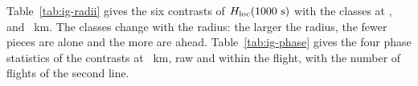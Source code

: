 Table~\ref{tab:ig-radii} gives the six contrasts of $\Hk$ with the classes at \IgRadLow, \IgRMain{} and \IgRadHigh~km. The classes change with the radius: the larger the radius, the fewer pieces are alone and the more are ahead. Table~\ref{tab:ig-phase} gives the four phase statistics of the contrasts at \IgRMain~km, raw and within the flight, with the number of flights of the second line.

\begin{table}
\centering\scriptsize
\setlength{\tabcolsep}{3pt}

\caption{The contrasts of $\Hk$ by the radius $R$ of the classes, raw and within the flight (flight), with 90\% bands.}
\label{tab:ig-radii}
\end{table}

\begin{table}
\centering\scriptsize
\setlength{\tabcolsep}{3pt}

\caption{The phase statistics of the contrasts at $R=\IgRMain$~km, with 90\% bands; points for the shares of time and of searches. Within the flight, the flights are those with phase time in both cells.}
\label{tab:ig-phase}
\end{table}
